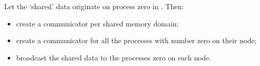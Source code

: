 \begin{exercise}
  \label{ex:shareddata}
  Let the `shared' data originate on process zero in
  . Then:
  \begin{itemize}
  \item create a communicator per shared memory domain;
  \item create a communicator for all the processes with number zero on their
    node;
  \item broadcast the shared data to the processes zero on each node.
  \end{itemize}
\end{exercise}
